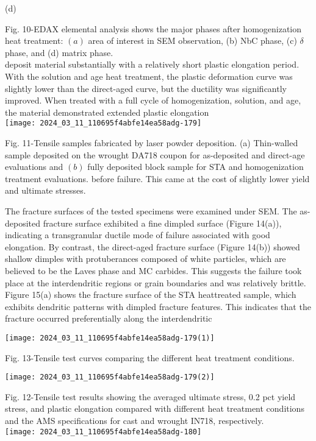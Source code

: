 \documentclass[10pt]{article}
\begin{document}
(d)

Fig. 10-EDAX elemental analysis shows the major phases after homogenization heat treatment: $(a)$ area of interest in SEM observation, (b) NbC phase, (c) $\delta$ phase, and (d) matrix phase.\\
deposit material substantially with a relatively short plastic elongation period. With the solution and age heat treatment, the plastic deformation curve was slightly lower than the direct-aged curve, but the ductility was significantly improved. When treated with a full cycle of homogenization, solution, and age, the material demonstrated extended plastic elongation\\
\texttt{[image: 2024\_03\_11\_110695f4abfe14ea58adg-179]}

Fig. 11-Tensile samples fabricated by laser powder deposition. (a) Thin-walled sample deposited on the wrought DA718 coupon for as-deposited and direct-age evaluations and $(b)$ fully deposited block sample for STA and homogenization treatment evaluations. before failure. This came at the cost of slightly lower yield and ultimate stresses.

The fracture surfaces of the tested specimens were examined under SEM. The as-deposited fracture surface exhibited a fine dimpled surface (Figure 14(a)), indicating a transgranular ductile mode of failure associated with good elongation. By contrast, the direct-aged fracture surface (Figure 14(b)) showed shallow dimples with protuberances composed of white particles, which are believed to be the Laves phase and MC carbides. This suggests the failure took place at the interdendritic regions or grain boundaries and was relatively brittle. Figure 15(a) shows the fracture surface of the STA heattreated sample, which exhibits dendritic patterns with dimpled fracture features. This indicates that the fracture occurred preferentially along the interdendritic

\begin{center}
\texttt{[image: 2024\_03\_11\_110695f4abfe14ea58adg-179(1)]}
\end{center}

Fig. 13-Tensile test curves comparing the different heat treatment conditions.

\begin{center}
\texttt{[image: 2024\_03\_11\_110695f4abfe14ea58adg-179(2)]}
\end{center}

Fig. 12-Tensile test results showing the averaged ultimate stress, 0.2 pct yield stress, and plastic elongation compared with different heat treatment conditions and the AMS specifications for cast and wrought IN718, respectively.\\
\texttt{[image: 2024\_03\_11\_110695f4abfe14ea58adg-180]}
\end{document}
